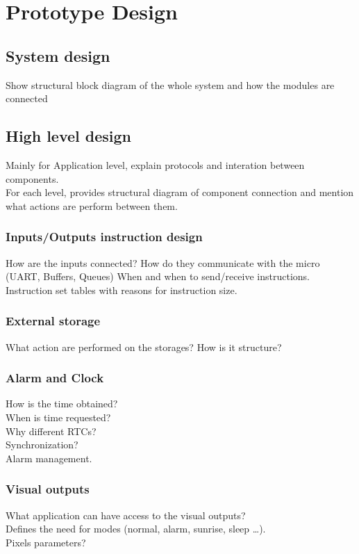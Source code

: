 \chapter{Prototype Design}


\section{System design}
Show structural block diagram of the whole system and how the modules are connected
 
\section{High level design}
Mainly for Application level, explain protocols and interation between components.\\
For each level, provides structural diagram of component connection and mention what actions are perform between them.
\subsection{Inputs/Outputs instruction design}
How are the inputs connected? How do they communicate with the micro (UART, Buffers, Queues)
When and when to send/receive instructions.\\
Instruction set tables with reasons for instruction size.
\subsection{External storage}
What action are performed on the storages? How is it structure?
\subsection{Alarm and Clock}
How is the time obtained?\\
When is time requested?\\
Why different RTCs?\\
Synchronization?\\
Alarm management.
\subsection{Visual outputs}
What application can have access to the visual outputs?\\
Defines the need for modes (normal, alarm, sunrise, sleep \ldots).\\
Pixels parameters?\\

